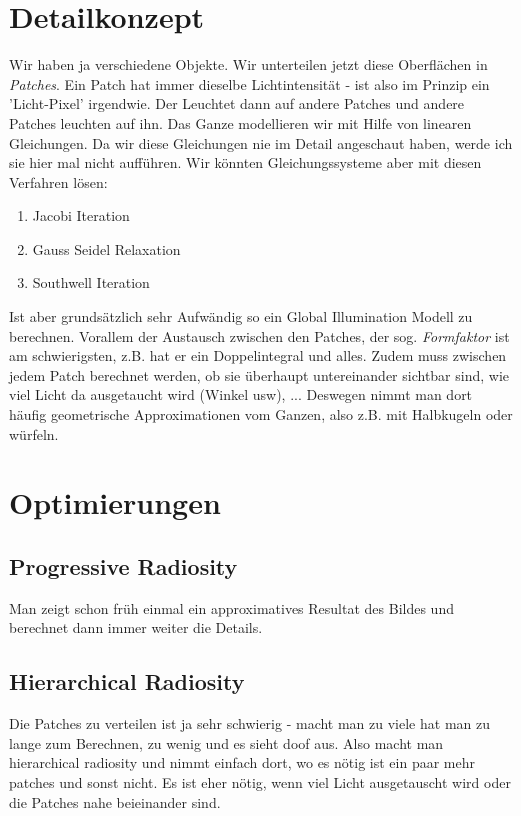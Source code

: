 \section{Detailkonzept}
Wir haben ja verschiedene Objekte. Wir unterteilen jetzt diese Oberflächen in \textit{Patches}. Ein Patch hat immer dieselbe Lichtintensität - ist also im Prinzip ein 'Licht-Pixel' irgendwie. Der Leuchtet dann auf andere Patches und andere Patches leuchten auf ihn. Das Ganze modellieren wir mit Hilfe von linearen Gleichungen. Da wir diese Gleichungen nie im Detail angeschaut haben, werde ich sie hier mal nicht aufführen. Wir könnten Gleichungssysteme aber mit diesen Verfahren lösen:
\begin{enumerate}
	\item Jacobi Iteration
	\item Gauss Seidel Relaxation
	\item Southwell Iteration
\end{enumerate}
Ist aber grundsätzlich sehr Aufwändig so ein Global Illumination Modell zu berechnen. Vorallem der Austausch zwischen den Patches, der sog. \textit{Formfaktor} ist am schwierigsten, z.B. hat er ein Doppelintegral und alles. Zudem muss zwischen jedem Patch berechnet werden, ob sie überhaupt untereinander sichtbar sind, wie viel Licht da ausgetaucht wird (Winkel usw), ... Deswegen nimmt man dort häufig geometrische Approximationen vom Ganzen, also z.B. mit Halbkugeln oder würfeln.

\section{Optimierungen}
\subsection{Progressive Radiosity}
Man zeigt schon früh einmal ein approximatives Resultat des Bildes und berechnet dann immer weiter die Details.
\subsection{Hierarchical Radiosity}
Die Patches zu verteilen ist ja sehr schwierig - macht man zu viele hat man zu lange zum Berechnen, zu wenig und es sieht doof aus. Also macht man hierarchical radiosity und nimmt einfach dort, wo es nötig ist ein paar mehr patches und sonst nicht. Es ist eher nötig, wenn viel Licht ausgetauscht wird oder die Patches nahe beieinander sind.